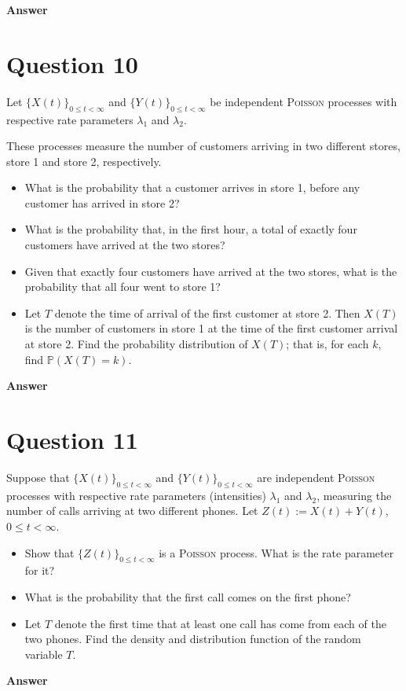 \documentclass[letterpaper]{article}
\begin{document}
		\textbf{Answer}
		
		\clearpage
		
		\section{Question 10}
		
		Let $\{X(t)\}_{0 \leq t < \infty}$ and $\{Y(t)\}_{0 \leq t < \infty}$ be independent \textsc{Poisson} processes with respective rate parameters $\lambda_1$ and $\lambda_2$.
		
		\indent These processes measure the number of customers arriving in two different stores, store 1 and store 2, respectively.
		\begin{itemize}
			\item[(a)] What is the probability that a customer arrives in store 1, before any customer has arrived in store 2?
			\item[(b)] What is the probability that, in the first hour, a total of exactly four customers have arrived at the two stores?
			\item[(c)] Given that exactly four customers have arrived at the two stores, what is the probability that all four went to store 1?
			\item[(d)] Let $T$ denote the time of arrival of the first customer at store 2. Then $X(T)$ is the number of customers in store 1 at the time of the first customer arrival at store 2. Find the probability distribution of $X(T)$; that is, for each $k$, find $\mathbb{P}(X(T) = k)$.
		\end{itemize}
		
		\textbf{Answer}
		
		\clearpage
		
		\section{Question 11}
		
		Suppose that $\{X(t)\}_{0 \leq t < \infty}$ and $\{Y(t)\}_{0 \leq t < \infty}$ are independent \textsc{Poisson} processes with respective rate parameters (intensities) $\lambda_1$ and $\lambda_2$, measuring the number of calls arriving at two different phones. Let $Z(t) := X(t) + Y(t)$, $0 \leq t < \infty$.
		\begin{itemize}
			\item[(a)] Show that $\{Z(t)\}_{0 \leq t < \infty}$ is a \textsc{Poisson} process. What is the rate parameter for it?
			\item[(b)] What is the probability that the first call comes on the first phone?
			\item[(c)] Let $T$ denote the first time that at least one call has come from each of the two phones. Find the density and distribution function of the random variable $T$.
		\end{itemize}
		
		\textbf{Answer}
		
		
	
\end{document}
